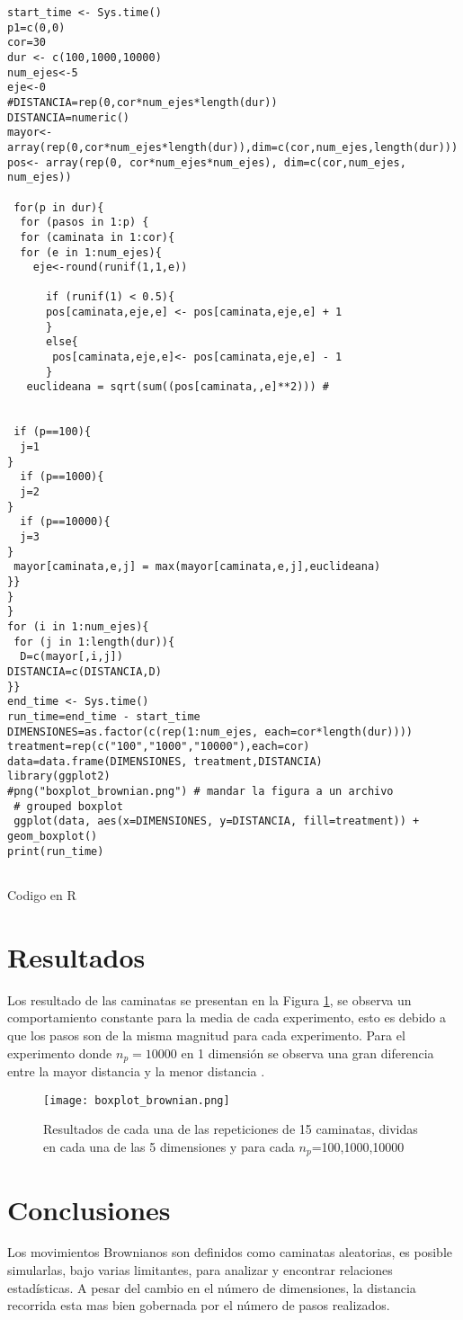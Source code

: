 \documentclass{article}
\renewcommand\lstlistingname{Código}
\begin{document}
\begin{listing}
\renewcommand\lstlistingname{Código}
\begin{verbatim}
start_time <- Sys.time()
p1=c(0,0)
cor=30
dur <- c(100,1000,10000)
num_ejes<-5
eje<-0
#DISTANCIA=rep(0,cor*num_ejes*length(dur))
DISTANCIA=numeric()
mayor<-array(rep(0,cor*num_ejes*length(dur)),dim=c(cor,num_ejes,length(dur)))
pos<- array(rep(0, cor*num_ejes*num_ejes), dim=c(cor,num_ejes, num_ejes))
 
 for(p in dur){
  for (pasos in 1:p) {
  for (caminata in 1:cor){
  for (e in 1:num_ejes){
    eje<-round(runif(1,1,e))
     
      if (runif(1) < 0.5){
      pos[caminata,eje,e] <- pos[caminata,eje,e] + 1
      }
      else{
       pos[caminata,eje,e]<- pos[caminata,eje,e] - 1
      }
   euclideana = sqrt(sum((pos[caminata,,e]**2))) # 
   
   
 if (p==100){
  j=1
}
  if (p==1000){
  j=2
}
  if (p==10000){
  j=3
}
 mayor[caminata,e,j] = max(mayor[caminata,e,j],euclideana)
}} 
}
}
for (i in 1:num_ejes){
 for (j in 1:length(dur)){
  D=c(mayor[,i,j])
DISTANCIA=c(DISTANCIA,D)
}}
end_time <- Sys.time()
run_time=end_time - start_time
DIMENSIONES=as.factor(c(rep(1:num_ejes, each=cor*length(dur))))
treatment=rep(c("100","1000","10000"),each=cor)
data=data.frame(DIMENSIONES, treatment,DISTANCIA)
library(ggplot2)
#png("boxplot_brownian.png") # mandar la figura a un archivo
 # grouped boxplot
 ggplot(data, aes(x=DIMENSIONES, y=DISTANCIA, fill=treatment)) +
geom_boxplot()
print(run_time)


\end{verbatim}
\caption{Codigo en R}
\label{listing:1}
\end{listing}
\section{Resultados}
Los resultado de las caminatas se presentan en la Figura \ref{CBP_1}, se observa un comportamiento constante para la media de cada experimento, esto es debido a que los pasos son de la misma magnitud para cada experimento. Para el experimento donde $n_p=10000$ en 1 dimensión se observa una gran diferencia entre la mayor distancia y la menor distancia  .
\begin{figure}[h] %
    \centering
    \texttt{[image: boxplot\_brownian.png]} %
    \caption{Resultados de cada una de las repeticiones de 15 caminatas, dividas en cada una de las 5 dimensiones y para cada $n_p$=100,1000,10000 }
    \label{CBP_1}
\end{figure}
\section{Conclusiones}
Los movimientos Brownianos son definidos como caminatas aleatorias, es posible simularlas, bajo varias limitantes, para analizar y encontrar relaciones estadísticas. A pesar del cambio en el número de dimensiones, la distancia recorrida esta mas bien gobernada por el número de pasos realizados. 


\end{document}

